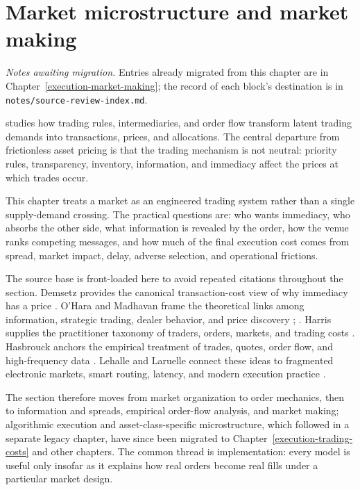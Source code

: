\chapter{Market microstructure and market making}\label{legacy:execution-market-making}

\noindent\emph{Notes awaiting migration.} Entries already migrated from this chapter are in Chapter~\ref{execution-market-making}; the record of each block's destination is in \texttt{notes/source-review-index.md}.

 studies how trading rules, intermediaries, and order flow transform latent trading demands into transactions, prices, and allocations. The central departure from frictionless asset pricing is that the trading mechanism is not neutral: priority rules, transparency, inventory, information, and immediacy affect the prices at which trades occur.

This chapter treats a market as an engineered trading system rather than a single supply-demand crossing. The practical questions are: who wants immediacy, who absorbs the other side, what information is revealed by the order, how the venue ranks competing messages, and how much of the final execution cost comes from spread, market impact, delay, adverse selection, and operational frictions.

The source base is front-loaded here to avoid repeated citations throughout the section. Demsetz provides the canonical transaction-cost view of why immediacy has a price \citep{demsetz-1968}. O'Hara and Madhavan frame the theoretical links among information, strategic trading, dealer behavior, and price discovery \citep{catalogue-0496}; \citep{madhavan-2000}. Harris supplies the practitioner taxonomy of traders, orders, markets, and trading costs \citep{alpha-harris}. Hasbrouck anchors the empirical treatment of trades, quotes, order flow, and high-frequency data \citep{s6-hasbrouck}. Lehalle and Laruelle connect these ideas to fragmented electronic markets, smart routing, latency, and modern execution practice \citep{alpha-laruelle}.

The section therefore moves from market organization to order mechanics, then to information and spreads, empirical order-flow analysis, and market making; algorithmic execution and asset-class-specific microstructure, which followed in a separate legacy chapter, have since been migrated to Chapter~\ref{execution-trading-costs} and other chapters. The common thread is implementation: every model is useful only insofar as it explains how real orders become real fills under a particular market design.

